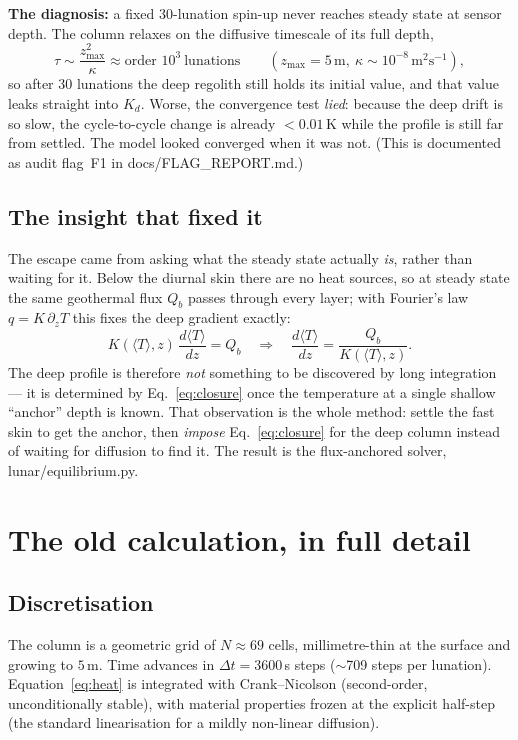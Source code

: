 \documentclass[11pt]{article}
\newcommand{\Tm}{\langle T\rangle}
\newcommand{\code}[1]{{\ttfamily\small #1}}
\begin{document}
\textbf{The diagnosis:} a fixed 30-lunation spin-up never reaches steady state at
sensor depth. The column relaxes on the diffusive timescale of its full depth,
\begin{equation}
\tau \sim \frac{z_{\max}^2}{\kappa}\approx \text{order }10^3\ \text{lunations}
\qquad(z_{\max}=5\,\text{m},\ \kappa\sim10^{-8}\,\mathrm{m^2 s^{-1}}),
\end{equation}
so after 30 lunations the deep regolith still holds its initial value, and that
value leaks straight into $K_d$. Worse, the convergence test \emph{lied}: because
the deep drift is so slow, the cycle-to-cycle change is already $<0.01$\,K while
the profile is still far from settled. The model looked converged when it was
not. (This is documented as audit flag~F1 in \code{docs/FLAG\_REPORT.md}.)

\subsection{The insight that fixed it}
The escape came from asking what the steady state actually \emph{is}, rather than
waiting for it. Below the diurnal skin there are no heat sources, so at steady
state the same geothermal flux $Q_b$ passes through every layer; with Fourier's
law $q=K\,\partial_z T$ this fixes the deep gradient exactly:
\begin{equation}
K(\Tm,z)\,\frac{d\Tm}{dz}=Q_b
\quad\Longrightarrow\quad
\frac{d\Tm}{dz}=\frac{Q_b}{K(\Tm,z)} .
\label{eq:closure}
\end{equation}
The deep profile is therefore \emph{not} something to be discovered by long
integration --- it is determined by Eq.~\eqref{eq:closure} once the temperature
at a single shallow ``anchor'' depth is known. That observation is the whole
method: settle the fast skin to get the anchor, then \emph{impose}
Eq.~\eqref{eq:closure} for the deep column instead of waiting for diffusion to
find it. The result is the flux-anchored solver, \code{lunar/equilibrium.py}.

\section{The old calculation, in full detail}
\subsection{Discretisation}
The column is a geometric grid of $N\approx69$ cells, millimetre-thin at the
surface and growing to $5$\,m. Time advances in $\Delta t=3600$\,s steps
($\sim$709 steps per lunation). Equation~\eqref{eq:heat} is integrated with
Crank--Nicolson (second-order, unconditionally stable), with material
properties frozen at the explicit half-step (the standard linearisation for a
mildly non-linear diffusion).
\end{document}
